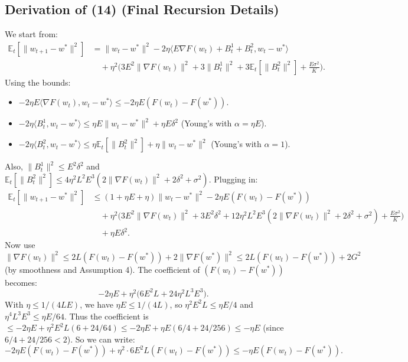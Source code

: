 \documentclass{article}
\begin{document}
\subsection*{Derivation of (14) (Final Recursion Details)}
We start from:
\begin{align}
\mathbb{E}_t[\|w_{t+1} - w^*\|^2] &= \|w_t - w^*\|^2 - 2\eta \Big\langle E \nabla F(w_t) + B_t^1 + B_t^2, w_t - w^* \Big\rangle \\
&\quad + \eta^2 \Big( 3E^2 \|\nabla F(w_t)\|^2 + 3\|B_t^1\|^2 + 3\mathbb{E}_t[\|B_t^2\|^2] + \frac{E\sigma^2}{K} \Big).
\end{align}
Using the bounds:
\begin{itemize}
    \item $-2\eta E \langle \nabla F(w_t), w_t - w^* \rangle \le -2\eta E (F(w_t) - F(w^*))$.
    \item $-2\eta \langle B_t^1, w_t - w^* \rangle \le \eta E \|w_t - w^*\|^2 + \eta E \delta^2$ (Young's with $\alpha = \eta E$).
    \item $-2\eta \langle B_t^2, w_t - w^* \rangle \le \eta \mathbb{E}_t[\|B_t^2\|^2] + \eta \|w_t - w^*\|^2$ (Young's with $\alpha=1$).
\end{itemize}
Also, $\|B_t^1\|^2 \le E^2 \delta^2$ and $\mathbb{E}_t[\|B_t^2\|^2] \le 4\eta^2 L^2 E^3 (2\|\nabla F(w_t)\|^2 + 2\delta^2 + \sigma^2)$.
Plugging in:
\begin{align}
\mathbb{E}_t[\|w_{t+1} - w^*\|^2] &\le (1 + \eta E + \eta) \|w_t - w^*\|^2 - 2\eta E (F(w_t) - F(w^*)) \\
&\quad + \eta^2 \Big( 3E^2 \|\nabla F(w_t)\|^2 + 3E^2\delta^2 + 12\eta^2 L^2 E^3 (2\|\nabla F(w_t)\|^2 + 2\delta^2 + \sigma^2) + \frac{E\sigma^2}{K} \Big) \\
&\quad + \eta E \delta^2.
\end{align}
Now use $\|\nabla F(w_t)\|^2 \le 2L (F(w_t) - F(w^*)) + 2\|\nabla F(w^*)\|^2 \le 2L (F(w_t) - F(w^*)) + 2G^2$ (by smoothness and Assumption 4). The coefficient of $(F(w_t) - F(w^*))$ becomes:
\begin{equation}
-2\eta E + \eta^2 \Big( 6E^2 L + 24\eta^2 L^3 E^3 \Big).
\end{equation}
With $\eta \le 1/(4LE)$, we have $\eta E \le 1/(4L)$, so $\eta^2 E^2 L \le \eta E / 4$ and $\eta^4 L^3 E^3 \le \eta E / 64$. Thus the coefficient is $\le -2\eta E + \eta^2 E^2 L (6 + 24/64) \le -2\eta E + \eta E (6/4 + 24/256) \le -\eta E$ (since $6/4 + 24/256 < 2$). So we can write:
\begin{equation}
-2\eta E (F(w_t) - F(w^*)) + \eta^2 \cdot 6E^2 L (F(w_t) - F(w^*)) \le -\eta E (F(w_t) - F(w^*)).
\end{equation}
\end{document}

